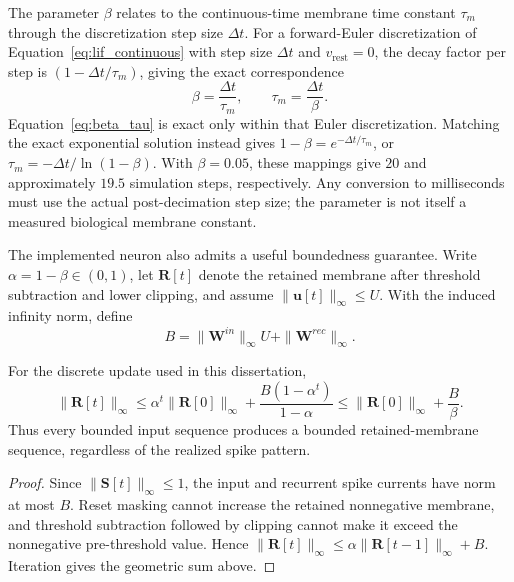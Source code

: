 The parameter $\beta$ relates to the continuous-time membrane time constant $\tau_m$ through the discretization step size $\Delta t$. For a forward-Euler discretization of Equation~\eqref{eq:lif_continuous} with step size $\Delta t$ and $v_{\text{rest}} = 0$, the decay factor per step is $(1 - \Delta t / \tau_m)$, giving the exact correspondence
\begin{equation}
    \beta = \frac{\Delta t}{\tau_m}, \qquad \tau_m = \frac{\Delta t}{\beta}.
    \label{eq:beta_tau}
\end{equation}
Equation~\eqref{eq:beta_tau} is exact only within that Euler discretization. Matching the exact exponential solution instead gives $1-\beta=e^{-\Delta t/\tau_m}$, or $\tau_m=-\Delta t/\ln(1-\beta)$. With $\beta=0.05$, these mappings give $20$ and approximately $19.5$ simulation steps, respectively. Any conversion to milliseconds must use the actual post-decimation step size; the parameter is not itself a measured biological membrane constant.

The implemented neuron also admits a useful boundedness guarantee. Write
$\alpha=1-\beta\in(0,1)$, let $\mathbf{R}[t]$ denote the retained membrane after
threshold subtraction and lower clipping, and assume
$\|\mathbf{u}[t]\|_\infty\le U$. With the induced infinity norm, define
\begin{equation}
B=\|\mathbf{W}^{in}\|_\infty U+\|\mathbf{W}^{rec}\|_\infty.
\end{equation}

\begin{theorem}
\label{thm:lif_bibs}
For the discrete update used in this dissertation,
\begin{equation}
\|\mathbf{R}[t]\|_\infty
\le \alpha^t\|\mathbf{R}[0]\|_\infty+
\frac{B(1-\alpha^t)}{1-\alpha}
\le \|\mathbf{R}[0]\|_\infty+\frac{B}{\beta}.
\end{equation}
Thus every bounded input sequence produces a bounded retained-membrane sequence,
regardless of the realized spike pattern.
\end{theorem}

\begin{proof}
Since $\|\mathbf{S}[t]\|_\infty\le1$, the input and recurrent spike currents
have norm at most $B$. Reset masking cannot increase the retained nonnegative
membrane, and threshold subtraction followed by clipping cannot make it exceed
the nonnegative pre-threshold value. Hence
$\|\mathbf{R}[t]\|_\infty\le \alpha\|\mathbf{R}[t-1]\|_\infty+B$.
Iteration gives the geometric sum above.
\end{proof}

